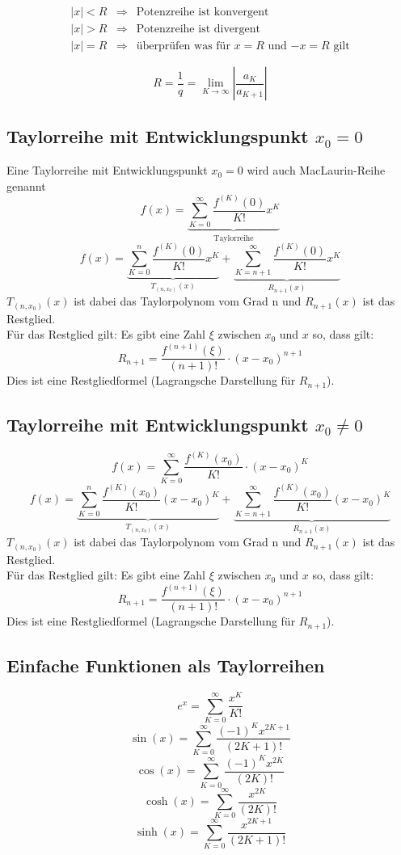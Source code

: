 \[ \boxed{ \begin{array}{lll} 
    |x| < R & \Rightarrow & \text{Potenzreihe ist konvergent} \\
    |x| > R & \Rightarrow & \text{Potenzreihe ist divergent} \\
    |x| = R & \Rightarrow & \text{überprüfen was für $x=R$ und $-x=R$ gilt}
\end{array} } \]

\[ \boxed{R = \frac{1}{q} = \lim_{K \rightarrow \infty} \left| \frac{a_K}{a_{K + 1}} \right|} \]

\subsection{Taylorreihe mit Entwicklungspunkt $x_0 = 0$}
Eine Taylorreihe mit Entwicklungspunkt $x_0 = 0$ wird auch MacLaurin-Reihe genannt
\[ \boxed{f(x) = \underbrace{\sum_{K=0}^{\infty}\frac{f^{(K)}(0)}{K!} x^K}_{\text{Taylorreihe}}} \]
\[ \boxed{f(x) = \underbrace{\sum_{K=0}^{n}\frac{f^{(K)}(0)}{K!} x^K}_{T_{(n,x_0)}(x)} + \underbrace{\sum_{K=n+1}^{\infty}\frac{f^{(K)}(0)}{K!} x^K}_{R_{n+1}(x)}} \]
$T_{(n,x_0)}(x)$ ist dabei das Taylorpolynom vom Grad n und $R_{n+1}(x)$ ist das Restglied. \\
Für das Restglied gilt: Es gibt eine Zahl $\xi$ zwischen $x_0$ und $x$ so, dass gilt: 
\[ \boxed{R_{n+1} = \frac{f^{(n + 1)}(\xi)}{(n + 1)!} \cdot (x - x_0)^{n + 1}} \]
Dies ist eine Restgliedformel (Lagrangsche Darstellung für $R_{n + 1}$). 

\subsection{Taylorreihe mit Entwicklungspunkt $x_0 \neq 0$}
\[ \boxed{f(x) = \sum_{K=0}^{\infty}\frac{f^{(K)}(x_0)}{K!}\cdot (x-x_0)^K} \]
\[ \boxed{f(x) = \underbrace{\sum_{K=0}^{n}\frac{f^{(K)}(x_0)}{K!} (x - x_0)^K}_{T_{(n,x_0)}(x)} + \underbrace{\sum_{K=n+1}^{\infty}\frac{f^{(K)}(x_0)}{K!} (x - x_0)^K}_{R_{n+1}(x)}} \]
$T_{(n,x_0)}(x)$ ist dabei das Taylorpolynom vom Grad n und $R_{n+1}(x)$ ist das Restglied. \\
Für das Restglied gilt: Es gibt eine Zahl $\xi$ zwischen $x_0$ und $x$ so, dass gilt: 
\[ \boxed{R_{n+1} = \frac{f^{(n + 1)}(\xi)}{(n + 1)!} \cdot (x - x_0)^{n + 1}} \]
Dies ist eine Restgliedformel (Lagrangsche Darstellung für $R_{n + 1}$). 

\subsection{Einfache Funktionen als Taylorreihen}
\[ \boxed{e^x = \sum_{K=0}^{\infty} \frac{x^K}{K!}} \]
\[ \boxed{\sin(x) = \sum_{K=0}^{\infty} \frac{(-1)^K x^{2K+1}}{(2K+1)!}} \]
\[ \boxed{\cos(x) = \sum_{K=0}^{\infty} \frac{(-1)^K x^{2K}}{(2K)!}} \]
\[ \boxed{\cosh(x) = \sum_{K=0}^{\infty} \frac{x^{2K}}{(2K)!}} \]
\[ \boxed{\sinh(x) = \sum_{K=0}^{\infty} \frac{x^{2K+1}}{(2K+1)!}} \]


